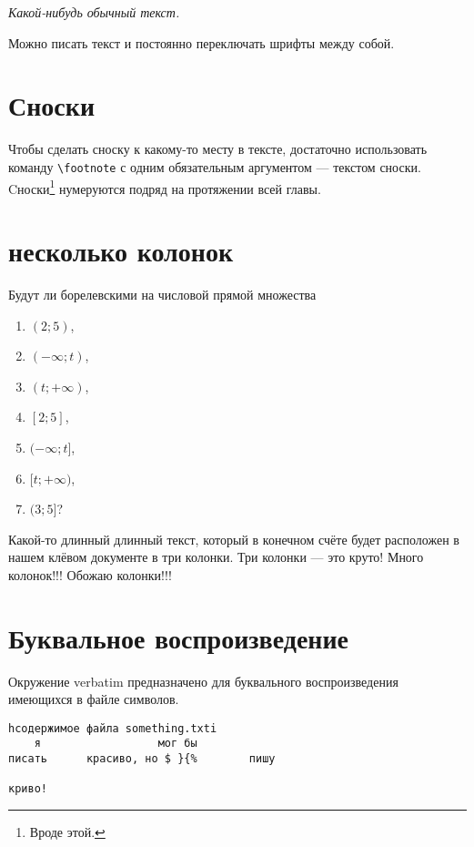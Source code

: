 \documentclass[12pt, a4paper]{article}
\begin{document}
\begin{Huge}
\emph{Какой-нибудь \emph{обычный}  текст.}
\end{Huge}

Можно писать текст и \LARGE постоянно переключать \tiny шрифты между \normalsize собой.


\section{Сноски}

Чтобы сделать сноску к какому-то месту в тексте, достаточно использовать команду \verb|\footnote| с одним обязательным аргументом — текстом сноски. Cноски\footnote{Вроде этой.} нумеруются подряд на протяжении всей главы. 


\section{несколько колонок} 

Будут ли борелевскими на числовой прямой множества
\begin{multicols}{2}
\begin{enumerate}
    \item $(2;5)$,
    \item $(-\infty;t)$,
    \item $(t; +\infty)$,
    \item $[2;5]$,     
    \item $(-\infty;t]$,
    \item $[t; +\infty)$,
    \item $(3;5]$? 
\end{enumerate}
\end{multicols}

\begin{multicols}{3}
Какой-то длинный длинный текст, который в конечном счёте будет расположен  в нашем клёвом документе в три колонки. Три колонки --- это круто! Много колонок!!! Обожаю колонки!!! 
\end{multicols}


\section{Буквальное воспроизведение}

Окружение verbatim предназначено для буквального воспроизведения имеющихся в файле символов.

\begin{verbatim}
hсодержимое файла something.txti
	я                  мог бы 
писать      красиво, но $ }{%        пишу 

криво!
\end{verbatim}
\end{document}
